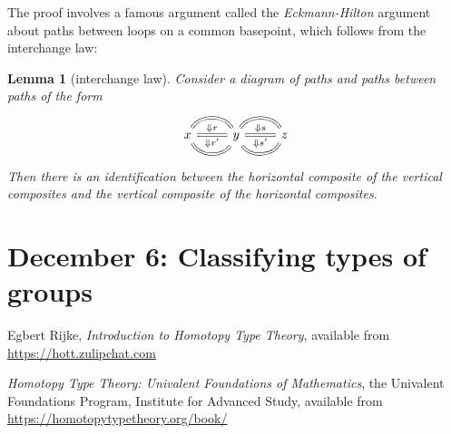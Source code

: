 \documentclass{amsart}
\theoremstyle{theorem}
\newtheorem*{lem}{Lemma}
\theoremstyle{definition}
\theoremstyle{remark}
\newcommand{\0}{\mathbbe{0}}
\newcommand{\1}{\mathbbe{1}}
\newcommand{\2}{\mathbbe{2}}
\newcommand{\3}{\mathbbe{3}}
\newcommand{\4}{\mathbbe{4}}
\begin{document}
The proof involves a famous argument called the \emph{Eckmann-Hilton} argument about paths between loops on a common basepoint, which follows from the interchange law:

\begin{lem}[interchange law] Consider a diagram of paths and paths between paths of the form
\[
\begin{tikzcd}
x \arrow[r, bend left=60, equals] \arrow[r, equals, "{\Downarrow r}", "{\Downarrow r'}"'] \arrow[r, bend right=60, equals] & y \arrow[r, bend left=60, equals] \arrow[r, equals, "{\Downarrow s}", "{\Downarrow s'}"'] \arrow[r, bend right=60, equals] & z
\end{tikzcd}
\]
Then there is an identification between the horizontal composite of the vertical composites and the vertical composite of the horizontal composites.
\end{lem}


\section*{December 6: Classifying types of groups}


\begin{thebibliography}{UF}


 Egbert Rijke, \emph{Introduction to Homotopy Type Theory}, available from \url{https://hott.zulipchat.com}

 \emph{Homotopy Type Theory: Univalent Foundations of Mathematics}, the Univalent Foundations Program, Institute for Advanced Study, available from \url{https://homotopytypetheory.org/book/}

\end{thebibliography}
\end{document}
